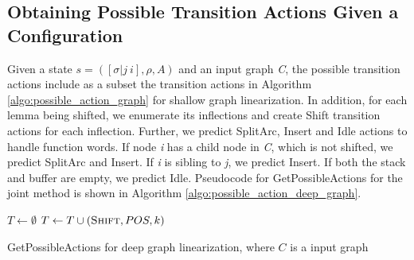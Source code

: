 \documentclass[11pt]{article}
\begin{document}
\subsection{Obtaining Possible Transition Actions Given a Configuration}
Given a state $s=([\sigma| j\ i], \rho, A)$ and an input graph {\it C}, the possible transition actions include as a subset the transition actions in Algorithm \ref{algo:possible_action_graph} for shallow graph linearization. In addition, for each lemma being shifted, we enumerate its inflections and create {\sc Shift} transition actions for each inflection. Further, we predict {\sc SplitArc}, {\sc Insert} and {\sc Idle} actions to handle function words. If node {\it i} has a child node in {\it C}, which is not shifted, we predict {\sc SplitArc} and {\sc Insert}. If {\it i} is sibling to {\it j}, we predict {\sc Insert}. If both the stack and buffer are empty, we predict {\sc Idle}. Pseudocode for {\sc GetPossibleActions} for the joint method is shown in Algorithm \ref{algo:possible_action_deep_graph}. \begin{algorithm}[!ht]
\small
\DontPrintSemicolon {}
$T \gets \emptyset$\;
 {
   {
    $T \gets T \cup {(\textsc{Shift}, POS, k)}$\;
  }
} 

\;
\caption{{\sc GetPossibleActions} for deep graph linearization, where $C$ is a input graph}
\label{algo:possible_action_deep_graph}
\end{algorithm}
\end{document}

